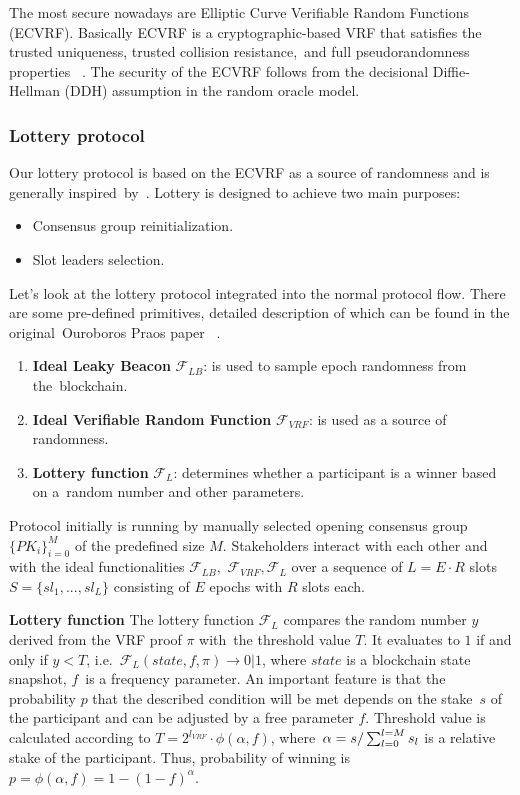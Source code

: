 The most secure nowadays are Elliptic Curve Verifiable Random Functions (ECVRF).
Basically ECVRF is a cryptographic-based VRF that satisfies the trusted uniqueness, trusted collision resistance,\
and full pseudorandomness properties ~\cite{cryptoeprint:2014/905}.
The security of the ECVRF follows from the decisional Diffie-Hellman (DDH) assumption in the random oracle model.

\subsubsection{Lottery protocol}
Our lottery protocol is based on the ECVRF as a source of randomness and is generally inspired\
by~\cite{cryptoeprint:2017/573}.
Lottery is designed to achieve two main purposes:
\begin{itemize}
    \item Consensus group reinitialization.
    \item Slot leaders selection.
\end{itemize}

Let's look at the lottery protocol integrated into the normal protocol flow.
There are some pre-defined primitives, detailed description of which can be found in the original\
Ouroboros Praos paper ~\cite{cryptoeprint:2017/573}.
\begin{enumerate}
    \item \textbf{Ideal Leaky Beacon} ${\mathcal{F}}_{LB}$: is used to sample epoch randomness from the\
    blockchain.
    \item \textbf{Ideal Verifiable Random Function} ${\mathcal{F}}_{VRF}$: is used as a source of randomness.
    \item \textbf{Lottery function} ${\mathcal{F}}_{L}$: determines whether a participant is a winner based on a\
    random number and other parameters.
\end{enumerate}
Protocol initially is running by manually selected opening consensus group $\{PK_i\}_{i=0}^M$ of the predefined size $M$.
Stakeholders interact with each other and with the ideal functionalities ${\mathcal{F}}_{LB}$,\
${\mathcal{F}}_{VRF}, {\mathcal{F}}_{L}$ over a sequence of $L = E \cdot R$ slots\
${S=\{sl_1,...,sl_L\}}$ consisting of $E$ epochs with $R$ slots each.

\textbf{Lottery function}
The lottery function ${\mathcal{F}}_{L}$ compares the random number $y$ derived from the VRF proof $\pi$ with\
the threshold value $T$.
It evaluates to $1$ if and only if ${y < T}$, i.e.\
${\mathcal{F}}_{L}(state, f, \pi) \rightarrow 0|1$, where $state$ is a blockchain state snapshot, $f$\
is a frequency parameter.
An important feature is that the probability $p$ that the described condition will be met depends on the stake\
$s$ of the participant and can be adjusted by a free parameter $f$.
Threshold value is calculated according to ${T = 2^{l_{VRF}}\cdot \phi(\alpha, f)}$, where\
${\alpha=s/\\\sum_{l=0}^{l=M} s_l}$ is a relative stake of the participant.
Thus, probability of winning is ${p = \phi(\alpha, f) = 1-(1-f)^{\alpha}}$.

